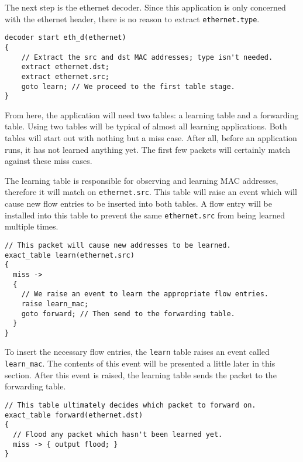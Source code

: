 The next step is the ethernet decoder. Since this application is only concerned with the
ethernet header, there is no reason to extract
\texttt{ethernet.type}.

\begin{codepage}
\begin{lstlisting}
decoder start eth_d(ethernet)
{
	// Extract the src and dst MAC addresses; type isn't needed.
	extract ethernet.dst;
	extract ethernet.src;
	goto learn; // We proceed to the first table stage.
}
\end{lstlisting}
\end{codepage}

From here, the application will need two tables: a learning table and a forwarding table.
Using two tables will be typical of almost all learning applications. Both
tables will start out with nothing but a miss case. After all, before an
application runs, it has not learned anything yet. The first few packets will
certainly match against these miss cases.

The learning table is responsible for observing and learning MAC addresses, therefore it will match on \texttt{ethernet.src}. This table will raise an event which will
cause new flow entries to be inserted into both tables.  A flow entry will be installed into this
table to prevent the same \texttt{ethernet.src} from being learned multiple
times.

\begin{codepage}
\begin{lstlisting}
// This packet will cause new addresses to be learned.
exact_table learn(ethernet.src)
{
  miss ->
  {
  	// We raise an event to learn the appropriate flow entries.
  	raise learn_mac;
    goto forward; // Then send to the forwarding table.
  }
}
\end{lstlisting}
\end{codepage}

To insert the necessary flow entries, the \texttt{learn} table raises an event
called \texttt{learn\_mac}. The contents of this event will be presented a little later in this section.
After this event is raised, the learning table sends the packet to the
forwarding table.

\begin{codepage}
\begin{lstlisting}
// This table ultimately decides which packet to forward on.
exact_table forward(ethernet.dst)
{
  // Flood any packet which hasn't been learned yet.
  miss -> { output flood; }
}
\end{lstlisting}
\end{codepage}

